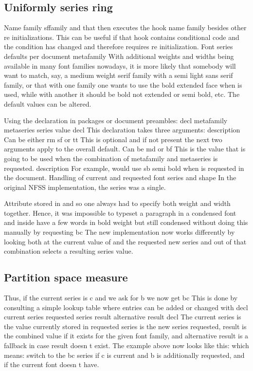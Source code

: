 \documentclass{article}
\begin{document}
\subsection{Uniformly series ring}
Name family sffamily and that then executes the hook name family besides other re initializations. This can be useful if that hook contains conditional code and the condition has changed and therefore requires re initialization. Font series defaults per document metafamily With additional weights and widths being available in many font families nowadays, it is more likely that somebody will want to match, say, a medium weight serif family with a semi light sans serif family, or that with one family one wants to use the bold extended face when is used, while with another it should be bold not extended or semi bold, etc. The default values can be altered.

Using the declaration in packages or document preambles: decl metafamily metaseries series value decl This declaration takes three arguments: description Can be either rm sf or tt This is optional and if not present the next two arguments apply to the overall default. Can be md or bf This is the value that is going to be used when the combination of metafamily and metaseries is requested. description For example, would use sb semi bold when is requested in the document. Handling of current and requested font series and shape In the original NFSS implementation, the series was a single.

Attribute stored in and so one always had to specify both weight and width together. Hence, it was impossible to typeset a paragraph in a condensed font and inside have a few words in bold weight but still condensed without doing this manually by requesting bc The new implementation now works differently by looking both at the current value of and the requested new series and out of that combination selects a resulting series value.

\subsection{Partition space measure}
Thus, if the current series is c and we ask for b we now get bc This is done by consulting a simple lookup table where entries can be added or changed with decl current series requested series result alternative result decl The current series is the value currently stored in requested series is the new series requested, result is the combined value if it exists for the given font family, and alternative result is a fallback in case result doesn t exist. The example above now looks like this: which means: switch to the bc series if c is current and b is additionally requested, and if the current font doesn t have.
\end{document}
